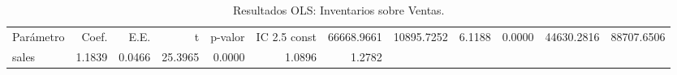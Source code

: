 \begin{table}
\caption{Resultados OLS: Inventarios sobre Ventas.}
\label{tab:ex8_m1}
\begin{tabular}{lrrrrrr}
\toprule
Parámetro & Coef. & E.E. & t & p-valor & IC 2.5%
\midrule
const & 66668.9661 & 10895.7252 & 6.1188 & 0.0000 & 44630.2816 & 88707.6506 \\
sales & 1.1839 & 0.0466 & 25.3965 & 0.0000 & 1.0896 & 1.2782 \\
\bottomrule
\end{tabular}
\end{table}
